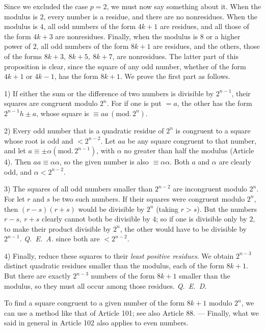 Since we excluded the case $p=2$, we must now say something about it. When the modulus is $2$, every number is a residue, and there are no nonresidues. When the modulus is $4$, all odd numbers of the form $4k+1$ are residues, and all those of the form $4k+3$ are nonresidues. Finally, when the modulus is $8$ or a higher power of $2$, all odd numbers of the form $8k+1$ are residues, and the others, those of the forms $8k+3,\ 8k+5,\ 8k+7$, are nonresidues. The latter part of this proposition is clear, since the square of any odd number, whether of the form $4k+1$ or $4k-1$, has the form $8k+1$. We prove the first part as follows.

1) If either the sum or the difference of two numbers is divisible by $2^{n-1}$, their squares are congruent modulo $2^n$. For if one is put $=a$, the other has the form $2^{n-1}h\pm a$, whose square is $\equiv aa\,(\mathrm{mod.}\,2^n)$.

2) Every odd number that is a quadratic residue of $2^n$ is congruent to a square whose root is odd and $<2^{n-2}$. Let $aa$ be any square congruent to that number, and let $a\equiv\pm\alpha (\mathrm{mod.}\,2^{n-1})$, with $\alpha$ no greater than half the modulus (Article 4). Then $aa\equiv\alpha\alpha$, so the given number is also $\equiv\alpha\alpha$. Both $a$ and $\alpha$ are clearly odd, and $\alpha<2^{n-2}$.

3) The squares of all odd numbers smaller than $2^{n-2}$ are incongruent modulo $2^n$. For let $r$ and $s$ be two such numbers. If their squares were congruent modulo $2^n$, then $(r-s)(r+s)$ would be divisible by $2^n$ (taking $r>s$). But the numbers $r-s,\ r+s$ clearly cannot both be divisible by $4$; so if one is divisible only by $2$, to make their product divisible by $2^n$, the other would have to be divisible by $2^{n-1}$. \mbox{\emph{Q. E. A.}} since both are $<2^{n-2}$.

4) Finally, reduce these squares to their \emph{least positive residues}. We obtain $2^{n-3}$ distinct quadratic residues smaller than the modulus, each of the form $8k+1$. But there are exactly $2^{n-3}$ numbers of the form $8k+1$ smaller than the modulus, so they must all occur among those residues. \mbox{\emph{Q. E. D.}}

To find a square congruent to a given number of the form $8k+1$ modulo $2^n$, we can use a method like that of Article 101; see also Article 88. --- Finally, what we said in general in Article 102 also applies to even numbers.

